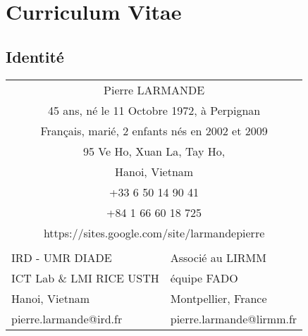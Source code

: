 \chapter{Curriculum Vitae}
\section{Identité}

\begin{center}
\begin{tabular}{cl}
\multicolumn{2}{c}{Pierre LARMANDE} \\
\multicolumn{2}{c}{45 ans, né le 11 Octobre 1972, à Perpignan} \\
\multicolumn{2}{c}{Français, marié, 2 enfants nés en 2002 et 2009} \\
\multicolumn{2}{c}{95 Ve Ho, Xuan La, Tay Ho,} \\
\multicolumn{2}{c}{Hanoi, Vietnam} \\
\multicolumn{2}{c}{+33 6 50 14 90 41} \\
\multicolumn{2}{c}{+84 1 66 60 18 725} \\
\multicolumn{2}{c}{https://sites.google.com/site/larmandepierre} \\
\multicolumn{1}{l}{} &  \\
\multicolumn{1}{l}{IRD - UMR DIADE} & Associé au LIRMM \\
\multicolumn{1}{l}{ICT Lab \& LMI RICE USTH} & équipe FADO \\
\multicolumn{1}{l}{Hanoi, Vietnam} & Montpellier, France \\
\multicolumn{1}{l}{pierre.larmande@ird.fr} & pierre.larmande@lirmm.fr
\end{tabular}
\end{center}

